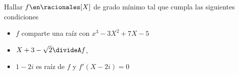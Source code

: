 \begin{enunciado}{\ejExtra}
        Hallar $f \en \racionales[X]$ de grado mínimo tal que cumpla las siguientes condiciones
	\begin{itemize}
		\item $f$ comparte una raíz con $x^3 - 3X^2 + 7X -5$
        \item $X+3-\sqrt{2} \divideA f$,
        \item $1-2 i$ es raíz de $f$ y $f'(X-2i) = 0$
	\end{itemize}
\end{enunciado}
\hacer
